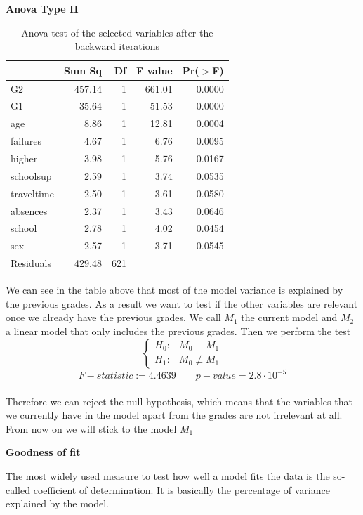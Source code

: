 \documentclass[a4paper, 11pt]{report}
\theoremstyle{definition}
\numberwithin{equation}{section}		%
\numberwithin{figure}{section}			%
\numberwithin{table}{section}				%
\begin{document}
\begin{table}[ht]
\centering
\textbf{Anova Type II}\par\medskip
\begin{tabular}{lrrrr}
  \hline
 & Sum Sq & Df & F value & Pr($>$F) \\
   \hline
G2 & 457.14 & 1 & 661.01 & 0.0000 \\
  G1 & 35.64 & 1 & 51.53 & 0.0000 \\
  age & 8.86 & 1 & 12.81 & 0.0004 \\
  failures & 4.67 & 1 & 6.76 & 0.0095 \\
  higher & 3.98 & 1 & 5.76 & 0.0167 \\
  schoolsup & 2.59 & 1 & 3.74 & 0.0535 \\
  traveltime & 2.50 & 1 & 3.61 & 0.0580 \\
  absences & 2.37 & 1 & 3.43 & 0.0646 \\
  school & 2.78 & 1 & 4.02 & 0.0454 \\
  sex & 2.57 & 1 & 3.71 & 0.0545 \\
  Residuals & 429.48 & 621 &  &  \\
   \hline
\end{tabular}
\caption{Anova test of the selected variables after the backward iterations}
\end{table}
We can see in the table above that most of the model variance is explained by the previous grades. As a result we want to test if the other variables are relevant once we already have the previous grades. We call $M_1$ the current model and $M_2$ a linear model that only includes the previous grades. Then we perform the test
\begin{equation}
    \begin{cases}
      H_0:  & M_0 \equiv M_1 \\
      H_1:  & M_0 \not\equiv M_1
    \end{cases}
  \end{equation}
    \bigskip
$$\boxed{F-statistic := 4.4639 \quad \quad  p-value =  2.8\cdot 10^{-5}}$$
\\[0.2in]
Therefore we can reject the null hypothesis, which means that the variables that we currently have in the model apart from the grades are not irrelevant at all. From now on we will stick to the model $M_1$
\newpage
\begin{center}\textbf{Goodness of fit}\end{center}\bigskip
The most widely used measure to test how well a model fits the data is the so-called coefficient of determination. It is basically the percentage of variance explained by the model.
\end{document}
